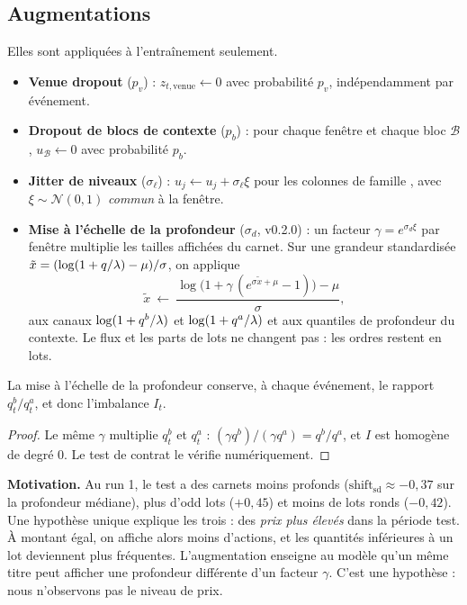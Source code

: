\subsection{Augmentations}\label{sec:aug}
Elles sont appliquées à l'entraînement seulement.
\begin{itemize}
\item \textbf{Venue dropout} ($p_v$) : $z_{t,\text{venue}}\leftarrow0$ avec probabilité $p_v$, indépendamment par événement.
\item \textbf{Dropout de blocs de contexte} ($p_b$) : pour chaque fenêtre et chaque bloc $\mathcal{B}$, $u_{\mathcal{B}}\leftarrow0$ avec probabilité $p_b$.
\item \textbf{Jitter de niveaux} ($\sigma_\ell$) : $u_j\leftarrow u_j+\sigma_\ell\xi$ pour les colonnes de famille , avec $\xi\sim\mathcal{N}(0,1)$ \emph{commun} à la fenêtre.
\item \textbf{Mise à l'échelle de la profondeur} ($\sigma_d$, v0.2.0) : un facteur $\gamma=e^{\sigma_d\xi}$ par fenêtre multiplie les tailles affichées du carnet. Sur une grandeur standardisée $\tilde x=(\log(1+q/\lambda)-\mu)/\sigma$, on applique
\begin{equation}
\tilde x\ \leftarrow\ \frac{\log\!\big(1+\gamma\,(e^{\sigma\tilde x+\mu}-1)\big)-\mu}{\sigma},
\end{equation}
aux canaux $\log(1+q^b/\lambda)$ et $\log(1+q^a/\lambda)$ et aux quantiles de profondeur du contexte. Le flux et les parts de lots ne changent pas : les ordres restent en lots.
\end{itemize}
\begin{proposition}
La mise à l'échelle de la profondeur conserve, à chaque événement, le rapport $q^b_t/q^a_t$, et donc l'imbalance $I_t$.
\end{proposition}
\begin{proof}
Le même $\gamma$ multiplie $q^b_t$ et $q^a_t$ : $(\gamma q^b)/(\gamma q^a)=q^b/q^a$, et $I$ est homogène de degré 0. Le test de contrat le vérifie numériquement.
\end{proof}
\noindent \textbf{Motivation.} Au run 1, le test a des carnets moins profonds ($\text{shift}_{\mathrm{sd}}\approx-0{,}37$ sur la profondeur médiane), plus d'odd lots ($+0{,}45$) et moins de lots ronds ($-0{,}42$). Une hypothèse unique explique les trois : des \emph{prix plus élevés} dans la période test. À montant égal, on affiche alors moins d'actions, et les quantités inférieures à un lot deviennent plus fréquentes. L'augmentation enseigne au modèle qu'un même titre peut afficher une profondeur différente d'un facteur $\gamma$. C'est une hypothèse : nous n'observons pas le niveau de prix.

